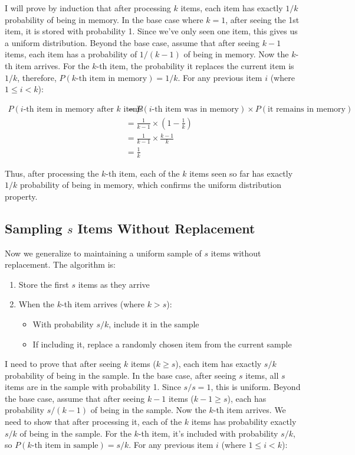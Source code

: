 \documentclass{article}
\begin{document}
I will prove by induction that after processing $k$ items, each item has exactly $1/k$ probability of being in memory. In the base case where $k=1$, after seeing the 1st item, it is stored with probability 1. Since we've only seen one item, this gives us a uniform distribution. Beyond the base case, assume that after seeing $k-1$ items, each item has a probability of $1/(k-1)$ of being in memory. Now the $k$-th item arrives. For the $k$-th item, the probability it replaces the current item is $1/k$, therefore, $P(k\text{-th item in memory}) = 1/k$. For any previous item $i$ (where $1 \leq i < k$):

\begin{align}
    P(i\text{-th item in memory after $k$ items}) &= P(i\text{-th item was in memory}) \times P(\text{it remains in memory}) \\
    &= \frac{1}{k-1} \times \left(1 - \frac{1}{k}\right) \\
    &= \frac{1}{k-1} \times \frac{k-1}{k} \\
    &= \frac{1}{k}
\end{align}

Thus, after processing the $k$-th item, each of the $k$ items seen so far has exactly $1/k$ probability of being in memory, which confirms the uniform distribution property.

\subsection{Sampling $s$ Items Without Replacement}

Now we generalize to maintaining a uniform sample of $s$ items without replacement. The algorithm is:
\begin{enumerate}
    \item Store the first $s$ items as they arrive
    \item When the $k$-th item arrives (where $k > s$):
    \begin{itemize}
        \item With probability $s/k$, include it in the sample
        \item If including it, replace a randomly chosen item from the current sample
    \end{itemize}
\end{enumerate}

I need to prove that after seeing $k$ items ($k \geq s$), each item has exactly $s/k$ probability of being in the sample. In the base case, after seeing $s$ items, all $s$ items are in the sample with probability 1. Since $s/s = 1$, this is uniform. Beyond the base case, assume that after seeing $k-1$ items ($k-1 \geq s$), each has probability $s/(k-1)$ of being in the sample. Now the $k$-th item arrives. We need to show that after processing it, each of the $k$ items has probability exactly $s/k$ of being in the sample. For the $k$-th item, it's included with probability $s/k$, so $P(k\text{-th item in sample}) = s/k$. For any previous item $i$ (where $1 \leq i < k$):
\end{document}
